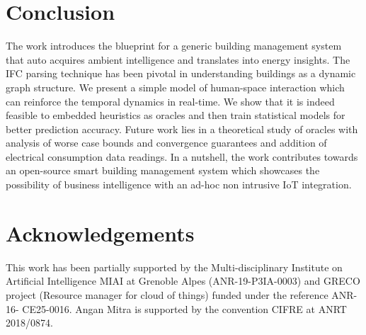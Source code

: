 \documentclass[conference]{IEEEtran}
\begin{document}
\section{Conclusion}
\label{section:conclusion}

The work introduces the blueprint for a generic building management system that auto acquires ambient intelligence and translates into energy insights. The IFC parsing technique has been pivotal in understanding buildings as a dynamic graph structure.
We present a simple model of human-space interaction which can reinforce the temporal dynamics in real-time. We show that it is indeed feasible to embedded heuristics as oracles and then train statistical models for better prediction accuracy.
Future work lies in a theoretical study of oracles with analysis of worse case bounds and convergence guarantees and addition of electrical consumption data readings. In a nutshell, the work contributes towards an open-source smart building management system which showcases the possibility of business intelligence with an ad-hoc non intrusive IoT integration.


\section{Acknowledgements }
This work has been partially supported by the Multi-disciplinary Institute on Artificial Intelligence MIAI at Grenoble Alpes (ANR-19-P3IA-0003) and GRECO project (Resource manager for cloud of things) funded under the reference ANR-16- CE25-0016. Angan Mitra is supported by the convention CIFRE at ANRT 2018/0874.




\end{document}
